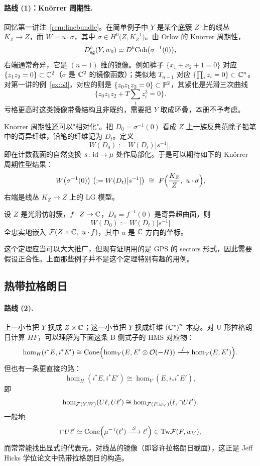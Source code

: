 \paragraph{路线 (1)：Knörrer 周期性.}\label{sec:knonrer}

回忆第一讲注~\ref{rem:linebundle}。在简单例子中 $Y$ 是某个底簇 $Z$ 上的线丛 $K_Z\to Z$，而 $W=u\cdot\sigma$，其中 $\sigma\in H^0\bigl(Z,K_Z^{-1}\bigr)$。由 Orlov 的 Knörrer 周期性，
\[
D^{b}_{\mathrm{sg}}(Y,w_0)\simeq D^{b}\mathrm{Coh}\bigl(\sigma^{-1}(0)\bigr),
\]
右端通常奇异，它是 $(n-1)$ 维的镜像。例如裤子 $\{x_1+x_2+1=0\}$ 对应 $\{z_1z_2=0\}\subset\mathbb{C}^2$（$\sigma$ 是 $\mathbb{C}^2$ 的镜像函数）；类似地 $T_{n-1}$ 对应 $\{\prod_i z_i=0\}\subset\mathbb{C}^n$。对第一讲的例~\ref{ex:o3}，对应的则是 $\{z_0z_1z_2=0\}\subset\mathbb{P}^2$，其紧化是光滑三次曲线
\[
\{z_0z_1z_2+T\textstyle\sum_i z_i^3=0\}.
\]
亏格更高时这类镜像带叠结构且非既约，需要把 $Y$ 取成环叠，本册不予考虑。

Knörrer 周期性还可以"相对化"。把 $D_0=\sigma^{-1}(0)$ 看成 $Z$ 上一族反典范除子铅笔中的奇异纤维，铅笔的纤维记为 $D_t$。定义
\[
W(D_0):=W(D_t)\bigl[s^{-1}\bigr],
\]
即在计数截面的自然变换 $s\colon\mathrm{id}\to\mu$ 处作局部化。于是可以期待如下的 Knörrer 周期性型结果：
\begin{equation}
W\bigl(\sigma^{-1}(0)\bigr)\ \bigl(:=W(D_t)[s^{-1}]\bigr)\ \cong\ F\Bigl(\frac{K_Z}{Z},\ u\cdot\sigma\Bigr),
\label{eq:jeffs}
\end{equation}
右端是线丛 $K_Z\to Z$ 上的 LG 模型。

\begin{theo}\label{thm:jeffs}
设 $Z$ 是光滑仿射簇，$f\colon Z\to\mathbb{C}$，$D_0=f^{-1}(0)$ 是奇异超曲面，则
\[
W(D_0):=W(D_t)\bigl[s^{-1}\bigr]
\]
全忠实地嵌入 $\mathcal{F}(Z\times\mathbb{C},\ u\cdot f)$，其中 $u$ 是 $\mathbb{C}$ 方向的坐标。
\end{theo}

这个定理应当可以大大推广，但现有证明用的是 GPS 的 sectors 形式，因此需要假设正合性。上面那些例子并不是这个定理特别有趣的用例。

\subsection{热带拉格朗日}

\paragraph{路线 (2).} 上一小节把 $Y$ 换成 $Z\times\mathbb{C}$；这一小节把 $Y$ 换成纤维 $\left(\mathbb{C}^*\right)^n$ 本身。对 U 形拉格朗日计算 $HF$，可以理解为下面这条 B 侧式子的 HMS 对应物：
\[
\hom_H(i^*E,i^*E')\cong\mathrm{Cone}\Bigl(\hom_V(E,E'\otimes\OO(-H))\xto{\ f\ }\hom_V(E,E')\Bigr).
\]
但也有一条更直接的路：
\[
\hom_H(i^*E,i^*E')\cong\hom_V(E,i_*i^*E'),
\]
即
\[
\hom_{\mathcal{F}(Y,W)}(U\ell,U\ell')\cong\hom_{\mathcal{F}(F,w_V)}(\ell,\cap U\ell').
\]
一般地
\[
\cap U\ell'\simeq\mathrm{Cone}\Bigl(\mu^{-1}(\ell')\xto{\ S\ }\ell'\Bigr)\in\Tw\FF(F,w_V),
\]
而常常能找出显式的代表元。对线丛的镜像（即容许拉格朗日截面），这正是 Jeff Hicks 学位论文中热带拉格朗日的构造。

